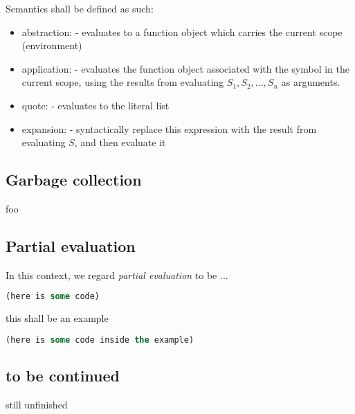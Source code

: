 \documentclass[main.tex]{subfiles}
\begin{document}
Semantics shall be defined as such:

\begin{itemize}
    \item abstraction:  - evaluates to
        a function object which carries the current scope (environment)
    \item application:  - evaluates the function
        object associated with the symbol  in the current scope,
        using the results from evaluating \(S_1, S_2, ..., S_n\) as arguments.
    \item quote:  - evaluates to the literal
        list 
    \item expansion:  - syntactically replace this expression
        with the result from evaluating \(S\), and then evaluate it
\end{itemize}

\subsection{Garbage collection}
foo

\subsection{Partial evaluation}

In this context, we regard \emph{partial evaluation} to be ...

\begin{lstwrap}\begin{lstlisting}[language=lisp]
(here is some code)
\end{lstlisting}\end{lstwrap}

\begin{mexample}
    this shall be an example
    \begin{lstwrap}\begin{lstlisting}[language=lisp]
    (here is some code inside the example)
    \end{lstlisting}\end{lstwrap}
\end{mexample}

\subsection{to be continued}
still unfinished \pika
\end{document}
